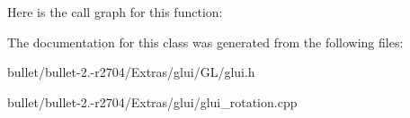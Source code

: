 Here is the call graph for this function\+:




The documentation for this class was generated from the following files\+:\begin{DoxyCompactItemize}
\item 
bullet/bullet-\/2.-\/r2704/\+Extras/glui/\+G\+L/glui.\+h\item 
bullet/bullet-\/2.-\/r2704/\+Extras/glui/glui\+\_\+rotation.\+cpp\end{DoxyCompactItemize}
